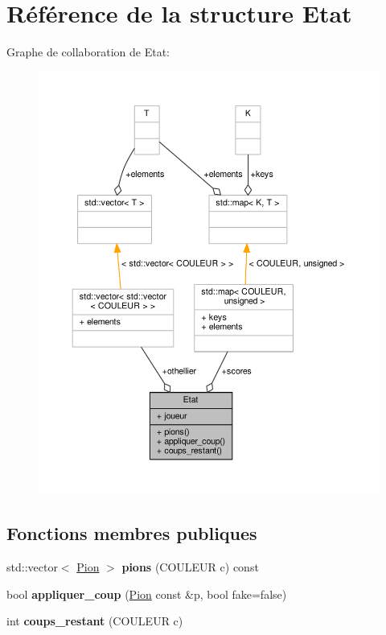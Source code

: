\hypertarget{structEtat}{}\section{Référence de la structure Etat}
\label{structEtat}


Graphe de collaboration de Etat\+:\nopagebreak
\begin{figure}[H]
\begin{center}
\leavevmode
\includegraphics[width=350pt]{structEtat__coll__graph}
\end{center}
\end{figure}
\subsection*{Fonctions membres publiques}
\begin{DoxyCompactItemize}
\item 
std\+::vector$<$ \hyperlink{structPion}{Pion} $>$ {\bfseries pions} (C\+O\+U\+L\+E\+UR c) const \hypertarget{structEtat_a761f4c386924ab4216613e394184d5df}{}\label{structEtat_a761f4c386924ab4216613e394184d5df}

\item 
bool {\bfseries appliquer\+\_\+coup} (\hyperlink{structPion}{Pion} const \&p, bool fake=false)\hypertarget{structEtat_a370b369a8152ebaa56e3ceb05bde698d}{}\label{structEtat_a370b369a8152ebaa56e3ceb05bde698d}

\item 
int {\bfseries coups\+\_\+restant} (C\+O\+U\+L\+E\+UR c)\hypertarget{structEtat_a2fda3d75bfd1ed013b55d3d83409c77c}{}\label{structEtat_a2fda3d75bfd1ed013b55d3d83409c77c}

\end{DoxyCompactItemize}
